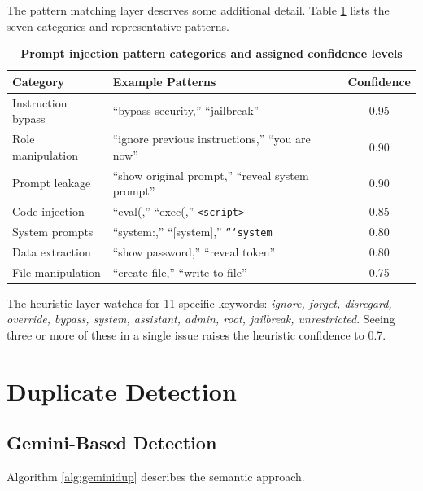 The pattern matching layer deserves some additional detail. Table \ref{tab:patterns} lists the seven categories and representative patterns.

\begin{table}[htb]
\centering
\renewcommand{\arraystretch}{1.3}
\setlength{\arrayrulewidth}{0.5mm}
\fontsize{10}{12}\selectfont
\caption[Prompt injection pattern categories and assigned confidence levels]{\textbf{Prompt injection pattern categories and assigned confidence levels}}
\vspace{2mm}
\label{tab:patterns}
\begin{tabular}{|p{3cm}|p{5.5cm}|c|}
\hline
\textbf{Category} & \textbf{Example Patterns} & \textbf{Confidence} \\
\hline
Instruction bypass & ``bypass security,'' ``jailbreak'' & 0.95 \\
\hline
Role manipulation & ``ignore previous instructions,'' ``you are now'' & 0.90 \\
\hline
Prompt leakage & ``show original prompt,'' ``reveal system prompt'' & 0.90 \\
\hline
Code injection & ``eval(,'' ``exec(,'' \texttt{<script>} & 0.85 \\
\hline
System prompts & ``system:,'' ``[system],'' \texttt{```system} & 0.80 \\
\hline
Data extraction & ``show password,'' ``reveal token'' & 0.80 \\
\hline
File manipulation & ``create file,'' ``write to file'' & 0.75 \\
\hline
\end{tabular}
\end{table}

The heuristic layer watches for 11 specific keywords: \textit{ignore, forget, disregard, override, bypass, system, assistant, admin, root, jailbreak, unrestricted}. Seeing three or more of these in a single issue raises the heuristic confidence to 0.7.

\section{Duplicate Detection}

\subsection{Gemini-Based Detection}
Algorithm \ref{alg:geminidup} describes the semantic approach.


